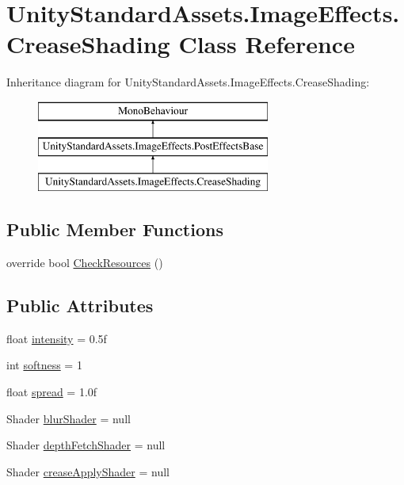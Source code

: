 \hypertarget{class_unity_standard_assets_1_1_image_effects_1_1_crease_shading}{}\section{Unity\+Standard\+Assets.\+Image\+Effects.\+Crease\+Shading Class Reference}
\label{class_unity_standard_assets_1_1_image_effects_1_1_crease_shading}
Inheritance diagram for Unity\+Standard\+Assets.\+Image\+Effects.\+Crease\+Shading\+:\begin{figure}[H]
\begin{center}
\leavevmode
\includegraphics[height=3.000000cm]{class_unity_standard_assets_1_1_image_effects_1_1_crease_shading}
\end{center}
\end{figure}
\subsection*{Public Member Functions}
\begin{DoxyCompactItemize}
\item 
override bool \mbox{\hyperlink{class_unity_standard_assets_1_1_image_effects_1_1_crease_shading_a66866d2b64013cd8e1931a9d0e19f101}{Check\+Resources}} ()
\end{DoxyCompactItemize}
\subsection*{Public Attributes}
\begin{DoxyCompactItemize}
\item 
float \mbox{\hyperlink{class_unity_standard_assets_1_1_image_effects_1_1_crease_shading_aa199f8c56f3d981085697dd18aefc8e9}{intensity}} = 0.\+5f
\item 
int \mbox{\hyperlink{class_unity_standard_assets_1_1_image_effects_1_1_crease_shading_ae25217da7ffbb2a1ce93c7a7ff0d6e06}{softness}} = 1
\item 
float \mbox{\hyperlink{class_unity_standard_assets_1_1_image_effects_1_1_crease_shading_a1b9d0a58714b3de96a34037b54619dc4}{spread}} = 1.\+0f
\item 
Shader \mbox{\hyperlink{class_unity_standard_assets_1_1_image_effects_1_1_crease_shading_aeb6788a00b36cb2329060575904b7585}{blur\+Shader}} = null
\item 
Shader \mbox{\hyperlink{class_unity_standard_assets_1_1_image_effects_1_1_crease_shading_ab9fe7c59fd430341cefb38972beada84}{depth\+Fetch\+Shader}} = null
\item 
Shader \mbox{\hyperlink{class_unity_standard_assets_1_1_image_effects_1_1_crease_shading_a0c806f11842a81c5193b14f374f9aa1b}{crease\+Apply\+Shader}} = null
\end{DoxyCompactItemize}
